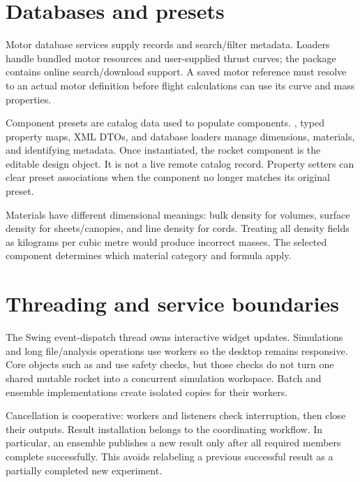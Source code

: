 \section{Databases and presets}
Motor database services supply  records and search/filter metadata. Loaders handle bundled motor resources and user-supplied thrust curves; the  package contains online search/download support. A saved motor reference must resolve to an actual motor definition before flight calculations can use its curve and mass properties.

Component presets are catalog data used to populate components. , typed property maps, XML DTOs, and database loaders manage dimensions, materials, and identifying metadata. Once instantiated, the rocket component is the editable design object. It is not a live remote catalog record. Property setters can clear preset associations when the component no longer matches its original preset.

Materials have different dimensional meanings: bulk density for volumes, surface density for sheets/canopies, and line density for cords. Treating all density fields as kilograms per cubic metre would produce incorrect masses. The selected component determines which material category and formula apply.

\section{Threading and service boundaries}
The Swing event-dispatch thread owns interactive widget updates. Simulations and long file/analysis operations use workers so the desktop remains responsive. Core objects such as  and  use safety checks, but those checks do not turn one shared mutable rocket into a concurrent simulation workspace. Batch and ensemble implementations create isolated copies for their workers.

Cancellation is cooperative: workers and listeners check interruption, then close their outputs. Result installation belongs to the coordinating workflow. In particular, an ensemble publishes a new result only after all required members complete successfully. This avoids relabeling a previous successful result as a partially completed new experiment.

